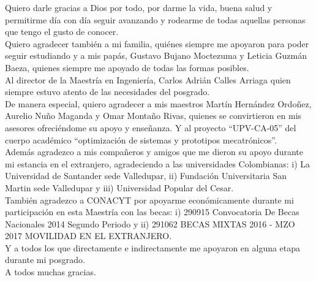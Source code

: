 Quiero darle gracias a Dios por todo, por darme la vida, buena salud y permitirme día con día seguir avanzando y rodearme de todas aquellas personas que tengo el gusto de conocer.\\[\separacionCorta] 

Quiero agradecer también a mi familia, quiénes siempre me apoyaron para poder seguir estudiando y a mis papás, Gustavo Bujano Moctezuma y Leticia Guzmán Baeza, quienes siempre me apoyado de todas las formas posibles.\\[\separacionCorta]

Al director de la Maestría en Ingeniería, Carlos Adrián Calles Arriaga quien siempre estuvo atento de las necesidades del posgrado.\\[\separacionCorta]

De manera especial, quiero agradecer a mis maestros Martín Hernández Ordoñez, Aurelio Nuño Maganda y Omar Montaño Rivas, quienes se convirtieron en mis asesores ofreciéndome su apoyo y enseñanza. Y al proyecto “UPV-CA-05” del cuerpo académico “optimización de sistemas y prototipos mecatrónicos”. \\[\separacionCorta]

Además agradezco a mis compañeros y amigos que me dieron su apoyo durante mi estancia en el extranjero, agradeciendo a las universidades Colombianas: i) La Universidad de Santander sede Valledupar, ii) Fundación Universitaria San Martin sede Valledupar y iii) Universidad Popular del Cesar.\\[\separacionCorta]

También agradezco a CONACYT por apoyarme económicamente durante mi participación en esta Maestría con las becas: i) 290915 Convocatoria De Becas Nacionales 2014 Segundo Periodo y ii) 291062 BECAS MIXTAS 2016 - MZO 2017 MOVILIDAD EN EL EXTRANJERO. \\[\separacionCorta]

Y a todos los que directamente e indirectamente me apoyaron en alguna etapa durante mi posgrado. \\[\separacionCorta]

A todos muchas gracias.\\[\separacionCorta]
